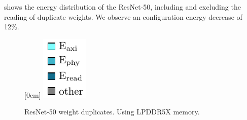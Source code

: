  shows the energy distribution of the ResNet-50, including and excluding the reading of duplicate weights. 
We observe an configuration energy decrease of 12\%.

\begin{figure}[hbtp]
    \centering
    \hfill
    \subcaptionbox*{}[0em]{
        \includegraphics{assets/legend.pdf}
    }
    \hfill
    \caption{ResNet-50 weight duplicates. Using LPDDR5X memory.}
    \label{fig:resnet50_weight_duplicates}
\end{figure}

